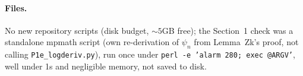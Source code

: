 \documentclass[11pt]{article}
\begin{document}
\paragraph{Files.} No new repository scripts (disk budget, $\sim5$GB free); the Section~1 check was
a standalone mpmath script (own re-derivation of $\psi_n$ from Lemma~Zk's proof, not calling
\texttt{P1e\_logderiv.py}), run once under \texttt{perl -e 'alarm 280; exec @ARGV'}, well under 1s
and negligible memory, not saved to disk.
\end{document}
